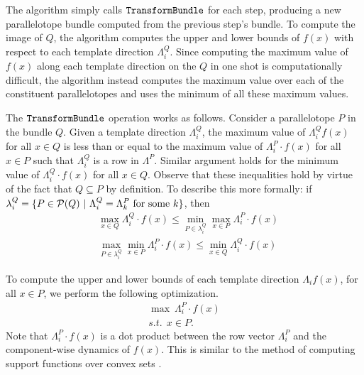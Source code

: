 The algorithm simply calls $\texttt{TransformBundle}$ for each step, producing a new parallelotope bundle computed from the previous step's bundle.
%
To compute the image of $Q$, the algorithm computes the upper and lower bounds of $f(x)$ with respect to each template direction $\Lambda_i^Q$.
%
Since computing the maximum value of $f(x)$ along each template direction on the $Q$ in one shot is computationally difficult, the algorithm instead computes the maximum value over each of the constituent parallelotopes and uses the minimum of all these maximum values.

The $\texttt{TransformBundle}$  operation works as follows.
%
Consider a parallelotope $P$ in the bundle $Q$.
%
Given a template direction $\Lambda_i^Q$, the maximum value of $\Lambda_{i}^Q f(x)$ for all $x \in Q$ is less than or equal to the maximum value of $\Lambda_{i}^P \cdot f(x)$ for all $x \in P$ such that $\Lambda_i^Q$ is a row in $\Lambda^P$.
%
Similar argument holds for the minimum value of $\Lambda_{i}^Q \cdot f(x)$ for all $x \in Q$.
%
Observe that these inequalities hold by virtue of the fact that $Q \subseteq P$ by definition.
%
To describe this more formally: if $\lambda^Q_i = \{ P \in \mathcal{P}(Q) ~|~ \Lambda_i^Q = \Lambda_k^P \text{ for some } k \}$, then
%
\begin{align}
    & \max_{x \in Q}{\Lambda_{i}^Q \cdot f(x)} \leq \min_{P \in \lambda^Q_i} {\max_{x \in P}{\Lambda_{i}^P \cdot f(x)}}  \label{eq:max_over_ptopes}
 \\
    & \max_{P \in \lambda^Q_i} {\min_{x \in P}{\Lambda_{i}^P \cdot f(x)}} \leq \min_{x \in Q}{\Lambda_{i}^Q \cdot f(x)} \label{eq:min_over_ptopes}
\end{align}

%
%
%
%
To compute the upper and lower bounds of each template direction $\Lambda_{i} f(x)$, for all $x \in P$, we perform the following optimization.
%
\begin{eqnarray}
  \max ~ \Lambda_i^{P} \cdot f(x) \label{eq:maxf}\\
  s.t. ~~ x \in P.\nonumber
\end{eqnarray}
%
\noindent Note that $\Lambda_i^{P} \cdot f(x)$ is a dot product between the row vector $\Lambda_i^{P}$ and the component-wise dynamics of $f(x)$. This is similar to the method of computing support functions over convex sets \cite{boyd2004convex}.



